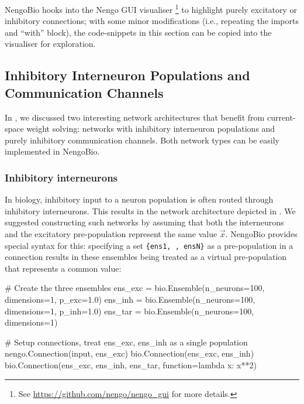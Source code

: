 NengoBio hooks into the Nengo GUI visualiser%
\footnote{See \url{https://github.com/nengo/nengo_gui} for more details.}
to highlight purely excitatory or inhibitory connections; with some minor modifications (i.e., repeating the imports and \enquote{with} block), the code-snippets in this section can be copied into the visualiser for exploration.

\subsection{Inhibitory Interneuron Populations and Communication Channels}
\label{sec:nengo_bio_inhibitory}

In , we discussed two interesting network architectures that benefit from current-space weight solving: networks with inhibitory interneuron populations and purely inhibitory communication channels.
Both network types can be easily implemented in NengoBio.

\subsubsection{Inhibitory interneurons}
In biology, inhibitory input to a neuron population is often routed through inhibitory interneurons.
This results in the network architecture depicted in .
We suggested constructing such networks by assuming that both the interneurons and the excitatory pre-population represent the same value $\vec x$.
NengoBio provides special syntax for this: specifying a set \texttt{\{ens1, \textellipsis, ensN\}} as a pre-population in a connection results in these ensembles being treated as a virtual pre-population that represents a common value:
\begin{pythoncode}
# Create the three ensembles
ens_exc = bio.Ensemble(n_neurons=100, dimensions=1, p_exc=1.0)
ens_inh = bio.Ensemble(n_neurons=100, dimensions=1, p_inh=1.0)
ens_tar = bio.Ensemble(n_neurons=100, dimensions=1)

# Setup connections, treat {ens_exc, ens_inh} as a single population
nengo.Connection(input, ens_exc)
bio.Connection(ens_exc, ens_inh)
bio.Connection({ens_exc, ens_inh}, ens_tar, function=lambda x: x**2)
\end{pythoncode}

